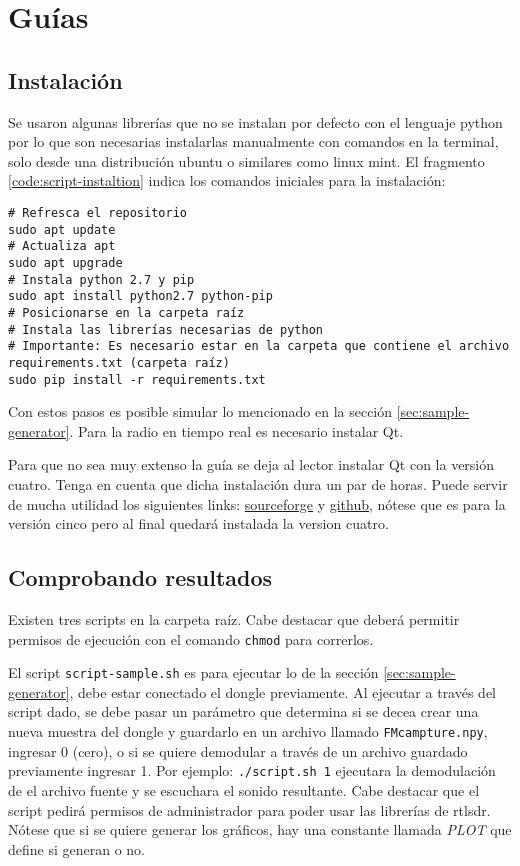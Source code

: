 \appendix
\clearpage
\addappheadtotoc
\appendixpage

\section{Guías}\label{ap:guia}

\subsection{Instalación}
Se usaron algunas librerías que no se instalan por defecto con el lenguaje python por lo que son necesarias instalarlas manualmente con comandos en la terminal, solo desde una distribución ubuntu o similares como linux mint.
El fragmento \ref{code:script-instaltion} indica los comandos iniciales para la instalación:

\begin{lstlisting}[caption={Script de intalación},label={code:script-instaltion},style={BashStyle}]
# Refresca el repositorio
sudo apt update
# Actualiza apt
sudo apt upgrade
# Instala python 2.7 y pip
sudo apt install python2.7 python-pip
# Posicionarse en la carpeta raíz
# Instala las librerías necesarias de python
# Importante: Es necesario estar en la carpeta que contiene el archivo requirements.txt (carpeta raíz)
sudo pip install -r requirements.txt
\end{lstlisting}

Con estos pasos es posible simular lo mencionado en la sección \ref{sec:sample-generator}. Para la radio en tiempo real es necesario instalar Qt.

Para que no sea muy extenso la guía se deja al lector instalar Qt con la versión cuatro. Tenga en cuenta que dicha instalación dura un par de horas.
Puede servir de mucha utilidad los siguientes links: \href{http://pyqt.sourceforge.net/Docs/PyQt5/installation.html}{sourceforge} y \href{https://github.com/pyqt/python-qt5/wiki/Installation}{github}, nótese que es para la versión cinco pero al final quedará instalada la version cuatro.

\subsection{Comprobando resultados}
Existen tres scripts en la carpeta raíz. Cabe destacar que deberá permitir permisos de ejecución con el comando \texttt{chmod} para correrlos.

El script \texttt{script-sample.sh} es para ejecutar lo de la sección \ref{sec:sample-generator}, debe estar conectado el dongle previamente. Al ejecutar a través del script dado, se debe pasar un parámetro que determina si se decea crear una nueva muestra del dongle y guardarlo en un archivo llamado \texttt{FMcampture.npy}, ingresar 0 (cero), o si se quiere demodular a través de un archivo guardado previamente ingresar 1.
Por ejemplo: \texttt{./script.sh 1} ejecutara la demodulación de el archivo fuente y se escuchara el sonido resultante. Cabe destacar que el script pedirá permisos de administrador para poder usar las librerías de rtlsdr. Nótese que si se quiere generar los gráficos, hay una constante llamada \emph{PLOT} que define si generan o no. 

